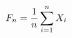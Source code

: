 \documentclass[preview]{standalone}
\begin{document}
\begin{align*}
\special{dvisvgm:raw <g id='unique000'>}F_n=\frac{1}{n}\sum_{i=1}^n X_i\special{dvisvgm:raw </g>}
\end{align*}
\end{document}
